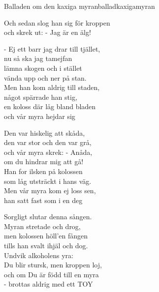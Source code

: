 \begin{song}{Balladen om den kaxiga myran}{balladkaxigamyran}
\begin{vers}
Och sedan slog han sig för kroppen\\
\repopen och skrek ut: - Jag är en älg! \repclose\\
\end{vers}
\begin{vers}
- Ej ett barr jag drar till tjället,\\
nu så ska jag tamejfan\\
lämna skogen och i stället\\
vända upp och ner på stan.\\
Men han kom aldrig till staden,\\
något spärrade han stig,\\
en koloss där låg bland bladen\\
\repopen och vår myra hejdar sig \repclose\\
\end{vers}
\begin{vers}
Den var hiskelig att skåda,\\
den var stor och den var grå,\\
och vår myra skrek: - Anåda,\\
om du hindrar mig att gå!\\
Han for ilsken på kolossen\\
som låg utsträckt i hans väg.\\
Men vår myra kom ej loss sen,\\
\repopen han satt fast som i en deg \repclose\\
\end{vers}

\newp

\begin{vers}
Sorgligt slutar denna sången.\\
Myran stretade och drog,\\
men kolossen höll'en fången\\
tills han svalt ihjäl och dog.\\
Undvik alkoholens yra:\\
Du blir stursk, men kroppen loj,\\
och om Du är född till en myra\\
\repopen - brottas aldrig med ett TOY \repclose\\
\end{vers}
\end{song}
